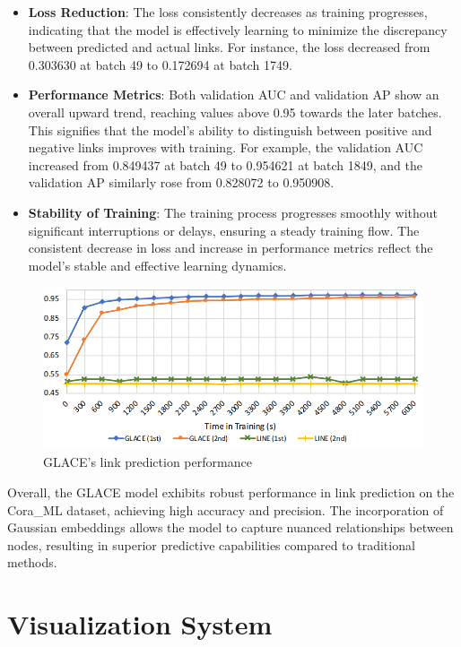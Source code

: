 \documentclass[11pt]{article}
\begin{document}
\begin{itemize}
    \item \textbf{Loss Reduction}: The loss consistently decreases as training progresses, indicating that the model is effectively learning to minimize the discrepancy between predicted and actual links. For instance, the loss decreased from 0.303630 at batch 49 to 0.172694 at batch 1749.
    
    \item \textbf{Performance Metrics}: Both validation AUC and validation AP show an overall upward trend, reaching values above 0.95 towards the later batches. This signifies that the model's ability to distinguish between positive and negative links improves with training. For example, the validation AUC increased from 0.849437 at batch 49 to 0.954621 at batch 1849, and the validation AP similarly rose from 0.828072 to 0.950908.
    
    \item \textbf{Stability of Training}: The training process progresses smoothly without significant interruptions or delays, ensuring a steady training flow. The consistent decrease in loss and increase in performance metrics reflect the model's stable and effective learning dynamics.
\end{itemize}
\begin{figure}
    \centering
    \includegraphics[width=0.9\linewidth]{img/link_prediction.jpg}
    \caption{GLACE's link prediction performance}
    \label{fig:enter-label}
\end{figure}
Overall, the GLACE model exhibits robust performance in link prediction on the Cora\_ML dataset, achieving high accuracy and precision. The incorporation of Gaussian embeddings allows the model to capture nuanced relationships between nodes, resulting in superior predictive capabilities compared to traditional methods.

\section{Visualization System}
\end{document}
